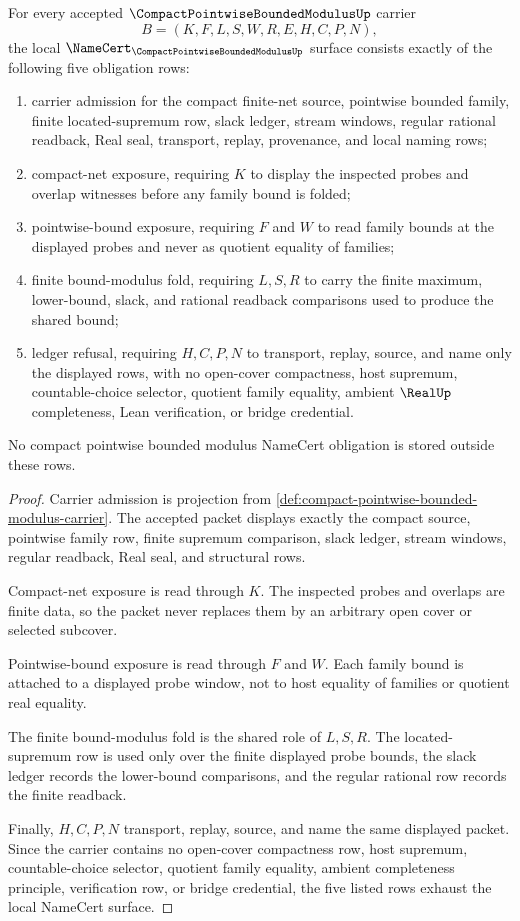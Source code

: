 \begin{theorem}
\label{thm:compact-pointwise-bounded-modulus-namecert-obligations}
For every accepted $\CompactPointwiseBoundedModulusUp$ carrier
$$
B=(K,F,L,S,W,R,E,H,C,P,N),
$$
the local $\NameCert_{\CompactPointwiseBoundedModulusUp}$ surface consists exactly of the following five obligation rows:
\begin{enumerate}
\item carrier admission for the compact finite-net source, pointwise bounded family, finite located-supremum row, slack ledger, stream windows, regular rational readback, Real seal, transport, replay, provenance, and local naming rows;
\item compact-net exposure, requiring $K$ to display the inspected probes and overlap witnesses before any family bound is folded;
\item pointwise-bound exposure, requiring $F$ and $W$ to read family bounds at the displayed probes and never as quotient equality of families;
\item finite bound-modulus fold, requiring $L,S,R$ to carry the finite maximum, lower-bound, slack, and rational readback comparisons used to produce the shared bound;
\item ledger refusal, requiring $H,C,P,N$ to transport, replay, source, and name only the displayed rows, with no open-cover compactness, host supremum, countable-choice selector, quotient family equality, ambient $\RealUp$ completeness, Lean verification, or bridge credential.
\end{enumerate}
No compact pointwise bounded modulus NameCert obligation is stored outside these rows.
\end{theorem}
\begin{proof}
Carrier admission is projection from \autoref{def:compact-pointwise-bounded-modulus-carrier}. The accepted packet displays exactly the compact source, pointwise family row, finite supremum comparison, slack ledger, stream windows, regular readback, Real seal, and structural rows.

Compact-net exposure is read through $K$. The inspected probes and overlaps are finite data, so the packet never replaces them by an arbitrary open cover or selected subcover.

Pointwise-bound exposure is read through $F$ and $W$. Each family bound is attached to a displayed probe window, not to host equality of families or quotient real equality.

The finite bound-modulus fold is the shared role of $L,S,R$. The located-supremum row is used only over the finite displayed probe bounds, the slack ledger records the lower-bound comparisons, and the regular rational row records the finite readback.

Finally, $H,C,P,N$ transport, replay, source, and name the same displayed packet. Since the carrier contains no open-cover compactness row, host supremum, countable-choice selector, quotient family equality, ambient completeness principle, verification row, or bridge credential, the five listed rows exhaust the local NameCert surface.
\end{proof}


